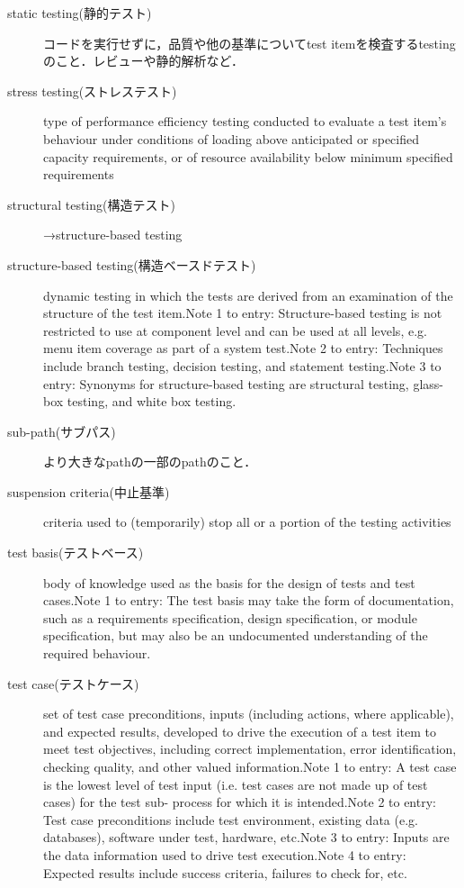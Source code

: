\begin{description}
    \item[static testing(静的テスト)]コードを実行せずに，品質や他の基準についてtest itemを検査するtestingのこと．レビューや静的解析など．
    \item[stress testing(ストレステスト)]type of performance efficiency testing conducted to evaluate a test item's behaviour under conditions of loading above anticipated or specified capacity requirements, or of resource availability below minimum specified requirements
    \item[structural testing(構造テスト)]→structure-based testing
    \item[structure-based testing(構造ベースドテスト)]dynamic testing in which the tests are derived from an examination of the structure of the test item.Note 1 to entry: Structure-based testing is not restricted to use at component level and can be used at all levels, e.g. menu item coverage as part of a system test.Note 2 to entry: Techniques include branch testing, decision testing, and statement testing.Note 3 to entry: Synonyms for structure-based testing are structural testing, glass-box testing, and white box testing.
    \item[sub-path(サブパス)]より大きなpathの一部のpathのこと．
    \item[suspension criteria(中止基準)]criteria used to (temporarily) stop all or a portion of the testing activities
    \item[test basis(テストベース)]body of knowledge used as the basis for the design of tests and test cases.Note 1 to entry: The test basis may take the form of documentation, such as a requirements specification, design specification, or module specification, but may also be an undocumented understanding of the required behaviour.
    \item[test case(テストケース)]set of test case preconditions, inputs (including actions, where applicable), and expected results, developed to drive the execution of a test item to meet test objectives, including correct implementation, error identification, checking quality, and other valued information.Note 1 to entry: A test case is the lowest level of test input (i.e. test cases are not made up of test cases) for the test sub- process for which it is intended.Note 2 to entry: Test case preconditions include test environment, existing data (e.g. databases), software under test, hardware, etc.Note 3 to entry: Inputs are the data information used to drive test execution.Note 4 to entry: Expected results include success criteria, failures to check for, etc.

\end{description}
